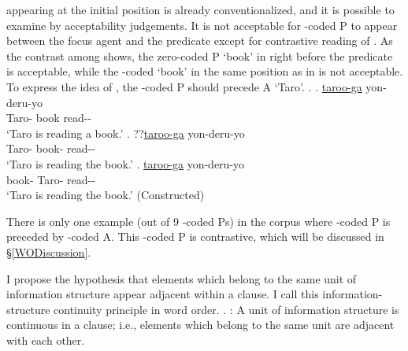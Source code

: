  appearing at the initial position is already conventionalized, and
it is possible to examine by acceptability judgements.
It is not acceptable for -coded P to appear between the focus agent and the predicate except for contrastive reading of .
As the contrast among \Next[a-c] shows,
the zero-coded P  `book' in \Next[a] right before the predicate is acceptable,
while the -coded  `book' in the same position as in \Next[b] is not acceptable.
To express the idea of \Next[b],
the -coded P should precede A  `Taro'.
%
\ex. \ag. \ul{taroo-ga}  yon-deru-yo \\
		Taro- book read-- \\
		`Taro is reading a book.'
	\bg. ??\ul{taroo-ga}  yon-deru-yo \\
		Taro- book- read-- \\
		`Taro is reading the book.'
	\bg.  \ul{taroo-ga} yon-deru-yo \\
		book- Taro- read-- \\
		`Taro is reading the book.'
		\hfill{(Constructed)}

There is only one example (out of 9 -coded Ps) in the corpus
where -coded P is preceded by -coded A.
This -coded P is contrastive, which will be discussed in \S \ref{WODiscussion}.

I propose the hypothesis that elements which belong to the same unit of information structure appear adjacent within a clause.
I call this information-structure continuity principle in word order.
%
\ex. \label{IScontinuityP}:
 A unit of information structure is continuous in a clause;
 i.e., elements which belong to the same unit are adjacent with each other.

